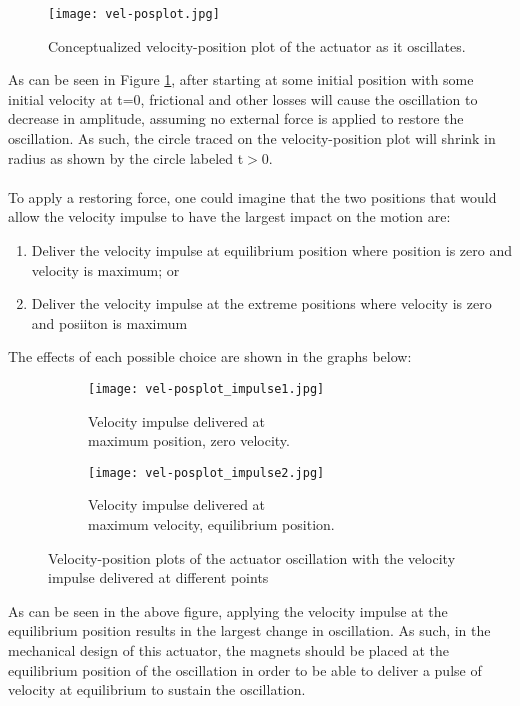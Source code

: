 \begin{figure}[h!]
\centering
\texttt{[image: vel-posplot.jpg]}
\caption{Conceptualized velocity-position plot of the actuator as it oscillates.}
\label{fig:velposplot}
\end{figure}

\noindent As can be seen in Figure \ref{fig:velposplot}, after starting at some initial position with some initial velocity at t=0, frictional and other losses will cause the oscillation to decrease in amplitude, assuming no external force is applied to restore the oscillation. As such, the circle traced on the velocity-position plot will shrink in radius as shown by the circle labeled t$>$0. \\ \\
%
To apply a restoring force, one could imagine that the two positions that would allow the velocity impulse to have the largest impact on the motion are:

\begin{enumerate}
\item Deliver the velocity impulse at equilibrium position where position is zero and velocity is maximum; or
\item Deliver the velocity impulse at the extreme positions where velocity is zero and posiiton is maximum
\end{enumerate}

\noindent The effects of each possible choice are shown in the graphs below:

\begin{figure}[h!]
\centering
\begin{subfigure}{.5\textwidth}
  \centering
  \texttt{[image: vel-posplot\_impulse1.jpg]}
  \caption{Velocity impulse delivered at \\ maximum position, zero velocity.}
  \label{fig:velpos_impulse1}
\end{subfigure}%
\begin{subfigure}{.5\textwidth}
  \centering
  \texttt{[image: vel-posplot\_impulse2.jpg]}
  \caption{Velocity impulse delivered at \\ maximum velocity, equilibrium position.}
  \label{velpos_impulse1}
\end{subfigure}
\caption{Velocity-position plots of the actuator oscillation with the velocity impulse delivered at different points}
\label{fig:impulseplots}
\end{figure}

\noindent As can be seen in the above figure, applying the velocity impulse at the equilibrium position results in the largest change in oscillation. As such, in the mechanical design of this actuator, the magnets should be placed at the equilibrium position of the oscillation in order to be able to deliver a pulse of velocity at equilibrium to sustain the oscillation.

